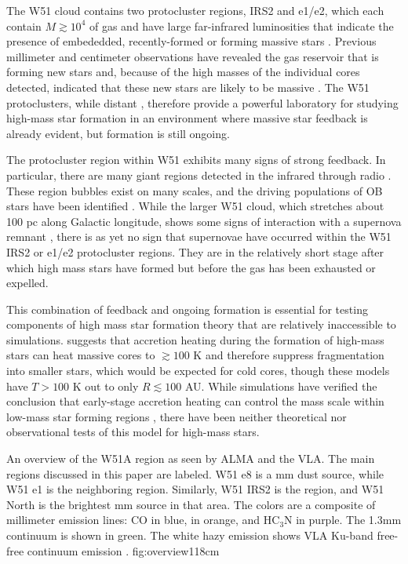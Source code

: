 \documentclass{emulateapj}
\begin{document}
The W51 cloud contains two protocluster regions, IRS2 and e1/e2, which each
contain $M\gtrsim10^4$ \msun of gas and have large far-infrared luminosities
that
indicate the presence of embededded, recently-formed or forming massive stars
\citep{Harvey1986a,Sievers1991a,Ginsburg2012a,Ginsburg2016b}.  Previous
millimeter and centimeter observations have revealed the gas reservoir
that is forming new stars and, because of the high masses of the individual
cores detected, indicated that these new stars are likely to be massive
\citep{Zhang1997a,Eisner2002a,Zapata2009a,Tang2009a,
Zapata2010a,Shi2010b,Shi2010a,Koch2010a,Koch2012a,Koch2012b,Tang2012a,Goddi2016a}.  The
W51 protoclusters, while distant \citep[5.4 kpc;][]{Sato2010a}, therefore
provide a powerful laboratory for studying high-mass star formation in an
environment where massive star feedback is already evident, but 
formation is still ongoing.

The protocluster region within W51 exhibits many signs of strong feedback.  In
particular, there are many giant \hii regions detected in the infrared through
radio \citep{Mehringer1994a,Ginsburg2015a}.  These \hii region bubbles exist
on many scales, and the driving populations of OB stars have been identified
\citep{Kumar2004a,Ginsburg2016a}.  While the larger W51 cloud, which stretches
about 100 pc along Galactic longitude, shows some signs of interaction with a
supernova remnant \citep{Brogan2013a,Ginsburg2015a}, there is as yet no
sign that supernovae have occurred within the W51 IRS2 or e1/e2 protocluster
regions.  They are in the relatively short stage after which high mass stars
have formed but before the gas has been exhausted or expelled.

This combination of feedback and ongoing formation is essential for testing
components of high mass star formation theory that are relatively inaccessible
to simulations.  \citet{Krumholz2006a} suggests that accretion heating during
the formation of high-mass stars can heat massive cores to $\gtrsim100$ K and
therefore suppress fragmentation into smaller stars, which would be expected
for cold cores, though these models have $T>100$ K out to only $R\lesssim100$
AU.  While simulations have verified the conclusion that early-stage accretion
heating can control the mass scale within low-mass star
forming regions \citep{Krumholz2007c,Offner2011b, Bate2012a,Bate2014b}, there
have been neither theoretical nor observational tests of this model for
high-mass stars. 

{An overview of the W51A region as seen by ALMA and the VLA.  The main regions
discussed in this paper are labeled.  W51 e8 is a mm dust source, while W51 e1
is the neighboring \hii region.  Similarly, W51 IRS2 is the \hii region, and
W51 North is the brightest mm source in that area.  The colors are a composite
of millimeter emission lines: CO in blue, \methanol in orange, and HC$_3$N in
purple.  The 1.3mm continuum is shown in green.  The white hazy emission
shows VLA Ku-band free-free continuum emission
\citep{Ginsburg2016b}.}
{fig:overview}{1}{18cm}
\end{document}
